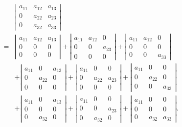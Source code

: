 \documentclass[UTF8, 12pt, fontset=fandol, oneside]{ctexart}
\begin{document}
\[
\begin{aligned}
&\left|\begin{array}{ccc}
a_{11} & a_{12} & a_{13}\\
0 & a_{22} & a_{23}\\
0 & a_{32} & a_{33}
\end{array}\right|\\
={}&
\left|\begin{array}{ccc}a_{11}&a_{12}&a_{13}\\0&0&0\\0&0&0\end{array}\right|
+
\left|\begin{array}{ccc}a_{11}&a_{12}&0\\0&0&a_{23}\\0&0&0\end{array}\right|
+
\left|\begin{array}{ccc}a_{11}&a_{12}&0\\0&0&0\\0&0&a_{33}\end{array}\right|\\
&+
\left|\begin{array}{ccc}a_{11}&0&a_{13}\\0&a_{22}&0\\0&0&0\end{array}\right|
+
\left|\begin{array}{ccc}a_{11}&0&0\\0&a_{22}&a_{23}\\0&0&0\end{array}\right|
+
\left|\begin{array}{ccc}a_{11}&0&0\\0&a_{22}&0\\0&0&a_{33}\end{array}\right|\\
&+
\left|\begin{array}{ccc}a_{11}&0&a_{13}\\0&0&0\\0&a_{32}&0\end{array}\right|
+
\left|\begin{array}{ccc}a_{11}&0&0\\0&0&a_{23}\\0&a_{32}&0\end{array}\right|
+
\left|\begin{array}{ccc}a_{11}&0&0\\0&0&0\\0&a_{32}&a_{33}\end{array}\right|.
\end{aligned}
\]
\end{document}
